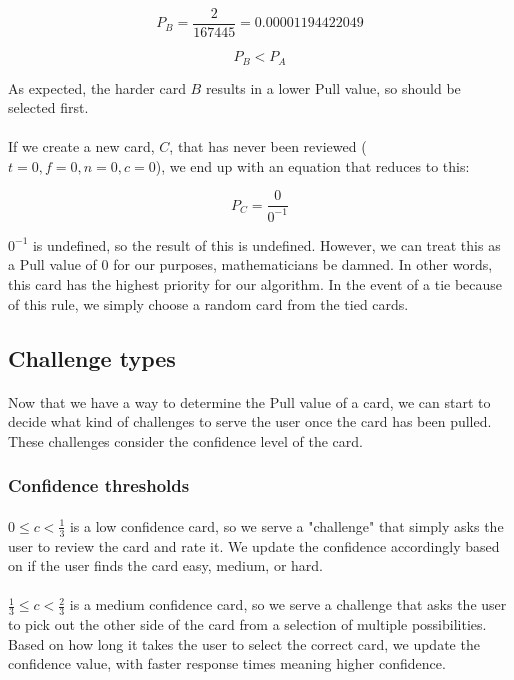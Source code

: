 \documentclass{report}
\begin{document}
\[
  P _ B = \frac{2}{167445} = 0.00001194422049
\]

\[
  P _ B < P _ A
\]

As expected, the harder card $B$ results in a lower Pull value, so should be selected first.

\paragraph{}
If we create a new card, $C$, that has never been reviewed ($t = 0, f = 0, n = 0, c = 0$), we end up with an equation that reduces to this:

\[
P _ C = \frac{0}{0 ^ {-1}}
\]

$0 ^ {-1}$ is undefined, so the result of this is undefined. However, we can treat this as a Pull value of $0$ for our purposes, mathematicians be damned. In other words, this card has the highest priority for our algorithm. In the event of a tie because of this rule, we simply choose a random card from the tied cards.

\subsection{Challenge types}
\paragraph{}
Now that we have a way to determine the Pull value of a card, we can start to decide what kind of challenges to serve the user once the card has been pulled. These challenges consider the confidence level of the card. 

\subsubsection{Confidence thresholds}
\paragraph{}
$0 \leq c < \frac{1}{3}$ is a low confidence card, so we serve a "challenge" that simply asks the user to review the card and rate it. We update the confidence accordingly based on if the user finds the card easy, medium, or hard.

\paragraph{}
$\frac{1}{3} \leq c < \frac{2}{3}$ is a medium confidence card, so we serve a challenge that asks the user to pick out the other side of the card from a selection of multiple possibilities. Based on how long it takes the user to select the correct card, we update the confidence value, with faster response times meaning higher confidence.
\end{document}
